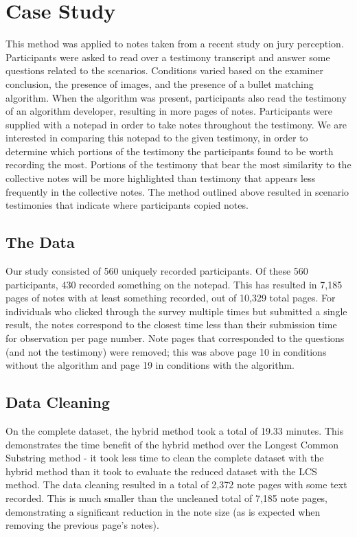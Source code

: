 \documentclass[print]{nuthesis}
\begin{document}
\hypertarget{case-study}{%
\section{Case Study}\label{case-study}}

This method was applied to notes taken from a recent study on jury perception.
Participants were asked to read over a testimony transcript and answer some questions related to the scenarios.
Conditions varied based on the examiner conclusion, the presence of images, and the presence of a bullet matching algorithm.
When the algorithm was present, participants also read the testimony of an algorithm developer, resulting in more pages of notes.
Participants were supplied with a notepad in order to take notes throughout the testimony.
We are interested in comparing this notepad to the given testimony, in order to determine which portions of the testimony the participants found to be worth recording the most.
Portions of the testimony that bear the most similarity to the collective notes will be more highlighted than testimony that appears less frequently in the collective notes.
The method outlined above resulted in scenario testimonies that indicate where participants copied notes.

\hypertarget{the-data}{%
\subsection{The Data}\label{the-data}}

Our study consisted of 560 uniquely recorded participants.
Of these 560 participants, 430 recorded something on the notepad.
This has resulted in 7,185 pages of notes with at least something recorded, out of 10,329 total pages.
For individuals who clicked through the survey multiple times but submitted a single result, the notes correspond to the closest time less than their submission time for observation per page number.
Note pages that corresponded to the questions (and not the testimony) were removed; this was above page 10 in conditions without the algorithm and page 19 in conditions with the algorithm.

\hypertarget{data-cleaning-1}{%
\subsection{Data Cleaning}\label{data-cleaning-1}}

On the complete dataset, the hybrid method took a total of 19.33 minutes.
This demonstrates the time benefit of the hybrid method over the Longest Common Substring method - it took less time to clean the complete dataset with the hybrid method than it took to evaluate the reduced dataset with the LCS method.
The data cleaning resulted in a total of 2,372 note pages with some text recorded.
This is much smaller than the uncleaned total of 7,185 note pages, demonstrating a significant reduction in the note size (as is expected when removing the previous page's notes).
\end{document}
